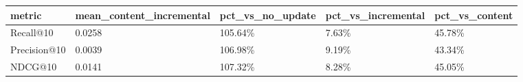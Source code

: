 \begin{tabular}{lllll}
\toprule
metric & mean_content_incremental & pct_vs_no_update & pct_vs_incremental & pct_vs_content \\
\midrule
Recall@10 & 0.0258 & 105.64\% & 7.63\% & 45.78\% \\
Precision@10 & 0.0039 & 106.98\% & 9.19\% & 43.34\% \\
NDCG@10 & 0.0141 & 107.32\% & 8.28\% & 45.05\% \\
\bottomrule
\end{tabular}
